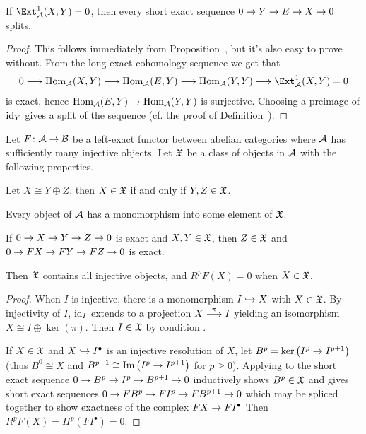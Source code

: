 \documentclass[a4paper,parskip=half,numbers=enddot, DIV=12]{scrreprt}
\begin{document}
\begin{cor}
	If $\Ext_\Aa^1(X,Y)=0$, then every short exact sequence $0\morphism Y\morphism E\morphism X\morphism 0$ splits.
\end{cor}
\begin{proof}
	This follows immediately from Proposition~, but it's also easy to prove without. From the long exact cohomology sequence  we get that
	\begin{align*}
		0\morphism\Hom_\Aa(X,Y)\morphism\Hom_\Aa(E,Y)\morphism\Hom_\Aa(Y,Y)\morphism \Ext_\Aa^1(X,Y)=0
	\end{align*}
	is exact, hence $\Hom_\Aa(E,Y)\morphism\Hom_\Aa(Y,Y)$ is surjective. Choosing a preimage of $\operatorname{id}_Y$ gives a split of the sequence (cf. the proof of Definition~).
\end{proof}
\begin{prop}
	Let $F\colon \Aa\morphism\Bb$ be a left-exact functor between abelian categories where $\mathcal{A}$ has sufficiently many injective objects. Let $\mathfrak{X}$ be a class of objects in $\mathcal{A}$ with the following properties.
	\begin{alphanumerate}
		\item Let $X\cong Y\oplus Z$, then $X\in\mathfrak{X}$ if and only if $Y,Z\in\mathfrak{X}$.
		\item Every object of $\mathcal{A}$ has a monomorphism into some element of $\mathfrak{X}$.
		\item If $0\morphism X\morphism Y\morphism Z\morphism 0$ is exact and $X,Y\in\mathfrak{X}$, then $Z\in\mathfrak{X}$ and $0\morphism FX\morphism FY\morphism FZ\morphism 0$  is exact.
	\end{alphanumerate}
	Then $\mathfrak{X}$ contains all injective objects, and $R^pF(X)=0$ when $X\in\mathfrak{X}$.
\end{prop}
\begin{proof}
	When $I$ is injective, there is a monomorphism $I\monomorphism X$ with $X\in \mathfrak{X}$. By injectivity of $I$, $\operatorname{id}_I$ extends to a projection $X\morphism[\pi]I$ yielding an isomorphism $X\cong I\oplus\ker(\pi)$. Then $I\in\mathfrak{X}$ by condition .
	
	If $X\in\mathfrak{X}$ and $X\monomorphism I^\bullet$ is an injective resolution of $X$, let $B^p=\ker\left(I^p\morphism I^{p+1}\right)$ (thus $B^0\cong X$ and $B^{p+1}\cong \Im\left(I^p\morphism I^{p+1}\right)$ for $p\geq 0$). Applying  to the short exact sequence $0\morphism B^p\morphism I^p\morphism B^{p+1}\morphism 0$ inductively shows $B^p\in \mathfrak{X}$ and gives short exact sequences $0\morphism FB^p\morphism FI^p\morphism FB^{p+1}\morphism 0$ which may be spliced together to show exactness of the complex $FX\morphism FI^\bullet$ Then $R^pF(X)=H^p(FI^\bullet)=0$.
\end{proof}
\end{document}
